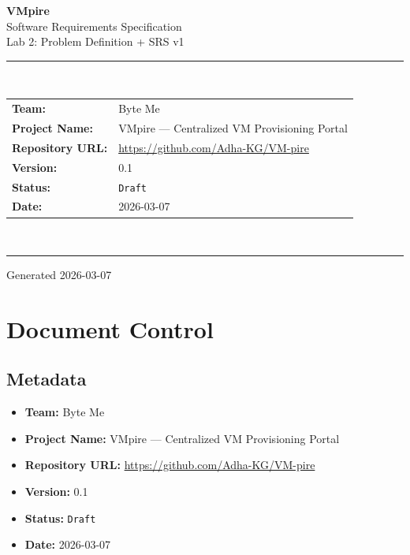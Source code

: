 \documentclass[12pt,letterpaper]{article}
\newcommand{\code}[1]{\texttt{\color{codegray}#1}}
\begin{document}
\begin{titlepage}
  \centering
  \vspace*{2cm}
  {\Huge\bfseries\color{titleblue} VMpire}\\[0.4cm]
  {\Large Software Requirements Specification}\\[0.3cm]
  {\large Lab 2: Problem Definition + SRS v1}\\[2cm]
  \rule{0.6\linewidth}{0.5pt}\\[0.4cm]
  \begin{tabular}{ll}
    \textbf{Team:}           & Byte Me \\
    \textbf{Project Name:}   & VMpire --- Centralized VM Provisioning Portal \\
    \textbf{Repository URL:} & \href{https://github.com/Adha-KG/VM-pire}{https://github.com/Adha-KG/VM-pire} \\
    \textbf{Version:}        & 0.1 \\
    \textbf{Status:}         & \code{Draft} \\
    \textbf{Date:}           & 2026-03-07 \\
  \end{tabular}\\[1.5cm]
  \rule{0.6\linewidth}{0.5pt}
  \vfill
  {\small Generated 2026-03-07}
\end{titlepage}

\tableofcontents
\newpage

\section{Document Control}

\subsection{Metadata}

\begin{itemize}
  \item \textbf{Team:} Byte Me
  \item \textbf{Project Name:} VMpire --- Centralized VM Provisioning Portal
  \item \textbf{Repository URL:} \href{https://github.com/Adha-KG/VM-pire}{https://github.com/Adha-KG/VM-pire}
  \item \textbf{Version:} 0.1
  \item \textbf{Status:} \code{Draft}
  \item \textbf{Date:} 2026-03-07
\end{itemize}
\end{document}
